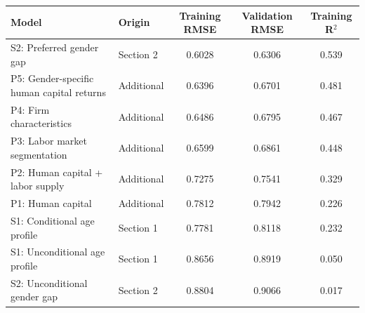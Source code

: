 \begin{tabular}{llccc}
\toprule
Model & Origin & Training RMSE & Validation RMSE & Training R$^2$ \\
\midrule
S2: Preferred gender gap & Section 2 & 0.6028 & 0.6306 & 0.539 \\
P5: Gender-specific human capital returns & Additional & 0.6396 & 0.6701 & 0.481 \\
P4: Firm characteristics & Additional & 0.6486 & 0.6795 & 0.467 \\
P3: Labor market segmentation & Additional & 0.6599 & 0.6861 & 0.448 \\
P2: Human capital + labor supply & Additional & 0.7275 & 0.7541 & 0.329 \\
P1: Human capital & Additional & 0.7812 & 0.7942 & 0.226 \\
S1: Conditional age profile & Section 1 & 0.7781 & 0.8118 & 0.232 \\
S1: Unconditional age profile & Section 1 & 0.8656 & 0.8919 & 0.050 \\
S2: Unconditional gender gap & Section 2 & 0.8804 & 0.9066 & 0.017 \\
\bottomrule
\end{tabular}
